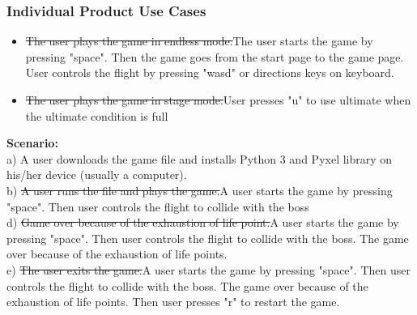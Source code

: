 \documentclass[12pt, titlepage]{article}
\begin{document}
\subsubsection{Individual Product Use Cases}
\begin{itemize}
    \item \sout{The user plays the game in endless mode.}{\color{red}The user starts the game by pressing "space". Then the game goes from the start page to the game page. User controls the flight by pressing "wasd" or directions keys on keyboard.}
    \item \sout{The user plays the game in stage mode.}{\color{red}User presses "u" to use ultimate when the ultimate condition is full}
\end{itemize}
\textbf{Scenario:}\\
a) A user downloads the game file and installs Python 3 and Pyxel library on his/her device (usually a computer). \\
b) \sout{A user runs the file and plays the game.}{\color{red}A user starts the game by pressing "space". Then user controls the flight to collide with the boss}\\
d) \sout{Game over because of the exhaustion of life point.}{\color{red}A user starts the game by pressing "space". Then user controls the flight to collide with the boss. The game over because of the exhaustion of life points.}\\
e) \sout{The user exits the game.}{\color{red}A user starts the game by pressing "space". Then user controls the flight to collide with the boss. The game over because of the exhaustion of life points. Then user presses "r" to restart the game.}
\end{document}
